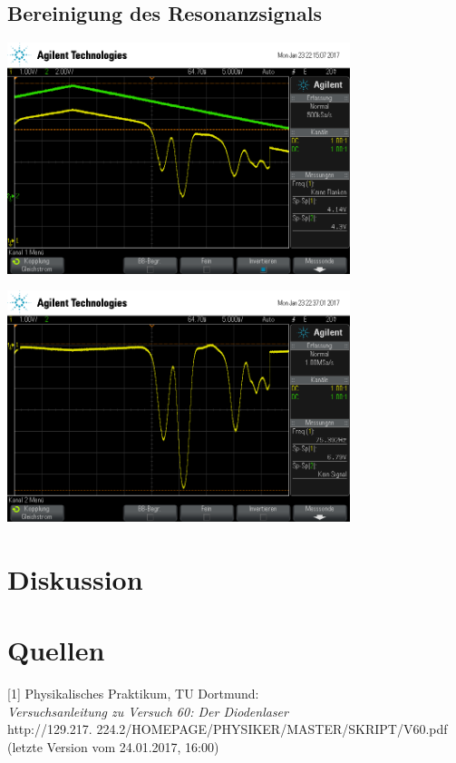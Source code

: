 \documentclass[captions=tableheading]{scrartcl}
\begin{document}
\subsection{Bereinigung des Resonanzsignals}

\begin{center}
	\includegraphics[width=10cm]{images/resonanz.png}
	\label{fig:resonanzlinien}
\end{center}

\begin{center}
	\includegraphics[width=10cm]{images/resonanz_bereinigt.png}
	\label{fig:resonanzlinien_mh}
	\end{center}

\section{Diskussion}

\section{Quellen}
{[1]} Physikalisches Praktikum, TU Dortmund: \\
\textit{Versuchsanleitung zu Versuch 60: Der Diodenlaser} \\
http://129.217.
224.2/HOMEPAGE/PHYSIKER/MASTER/SKRIPT/V60.pdf (letzte Version vom 24.01.2017, 16:00)\\
\end{document}
